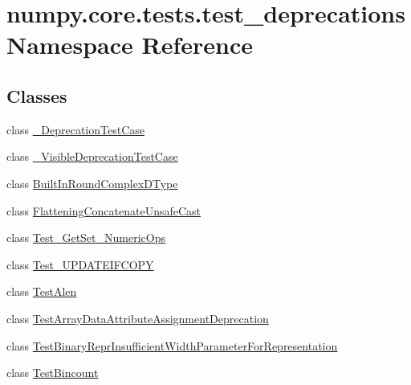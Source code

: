 \hypertarget{namespacenumpy_1_1core_1_1tests_1_1test__deprecations}{}\section{numpy.\+core.\+tests.\+test\+\_\+deprecations Namespace Reference}
\label{namespacenumpy_1_1core_1_1tests_1_1test__deprecations}
\subsection*{Classes}
\begin{DoxyCompactItemize}
\item 
class \hyperlink{classnumpy_1_1core_1_1tests_1_1test__deprecations_1_1__DeprecationTestCase}{\+\_\+\+Deprecation\+Test\+Case}
\item 
class \hyperlink{classnumpy_1_1core_1_1tests_1_1test__deprecations_1_1__VisibleDeprecationTestCase}{\+\_\+\+Visible\+Deprecation\+Test\+Case}
\item 
class \hyperlink{classnumpy_1_1core_1_1tests_1_1test__deprecations_1_1BuiltInRoundComplexDType}{Built\+In\+Round\+Complex\+D\+Type}
\item 
class \hyperlink{classnumpy_1_1core_1_1tests_1_1test__deprecations_1_1FlatteningConcatenateUnsafeCast}{Flattening\+Concatenate\+Unsafe\+Cast}
\item 
class \hyperlink{classnumpy_1_1core_1_1tests_1_1test__deprecations_1_1Test__GetSet__NumericOps}{Test\+\_\+\+Get\+Set\+\_\+\+Numeric\+Ops}
\item 
class \hyperlink{classnumpy_1_1core_1_1tests_1_1test__deprecations_1_1Test__UPDATEIFCOPY}{Test\+\_\+\+U\+P\+D\+A\+T\+E\+I\+F\+C\+O\+PY}
\item 
class \hyperlink{classnumpy_1_1core_1_1tests_1_1test__deprecations_1_1TestAlen}{Test\+Alen}
\item 
class \hyperlink{classnumpy_1_1core_1_1tests_1_1test__deprecations_1_1TestArrayDataAttributeAssignmentDeprecation}{Test\+Array\+Data\+Attribute\+Assignment\+Deprecation}
\item 
class \hyperlink{classnumpy_1_1core_1_1tests_1_1test__deprecations_1_1TestBinaryReprInsufficientWidthParameterForRepresentation}{Test\+Binary\+Repr\+Insufficient\+Width\+Parameter\+For\+Representation}
\item 
class \hyperlink{classnumpy_1_1core_1_1tests_1_1test__deprecations_1_1TestBincount}{Test\+Bincount}
\item 

\end{DoxyCompactItemize}
